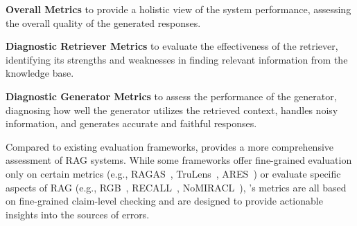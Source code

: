 \begin{enumerate*}
    \item \textbf{Overall Metrics} to provide a holistic view of the system performance, assessing the overall quality of the generated responses.
    \item \textbf{Diagnostic Retriever Metrics} to evaluate the effectiveness of the retriever, identifying its strengths and weaknesses in finding relevant information from the knowledge base.
    \item \textbf{Diagnostic Generator Metrics} to assess the performance of the generator, diagnosing how well the generator utilizes the retrieved context, handles noisy information, and generates accurate and faithful responses.



    
\end{enumerate*}





Compared to existing evaluation frameworks, \benchname\space provides a more comprehensive assessment of RAG systems. While some frameworks offer fine-grained evaluation only on certain metrics (e.g., RAGAS~\cite{es2023ragas}, TruLens~\cite{TruLens}, ARES~\cite{saadfalcon2023ares}) or evaluate specific aspects of RAG (e.g., RGB~\cite{chen2024benchmarking}, RECALL~\cite{liu2023recall}, NoMIRACL~\cite{thakur2023nomiracl}), \benchname's metrics are all based on fine-grained claim-level checking and are designed to provide actionable insights into the sources of errors. 

